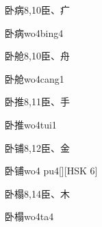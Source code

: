 \begin{Entry}{卧病}{8,10}{⾂、⽧}
  \begin{Phonetics}{卧病}{wo4bing4}
  \end{Phonetics}
\end{Entry}

\begin{Entry}{卧舱}{8,10}{⾂、⾈}
  \begin{Phonetics}{卧舱}{wo4cang1}
  \end{Phonetics}
\end{Entry}

\begin{Entry}{卧推}{8,11}{⾂、⼿}
  \begin{Phonetics}{卧推}{wo4tui1}
  \end{Phonetics}
\end{Entry}

\begin{Entry}{卧铺}{8,12}{⾂、⾦}
  \begin{Phonetics}{卧铺}{wo4 pu4}[][HSK 6]
  \end{Phonetics}
\end{Entry}

\begin{Entry}{卧榻}{8,14}{⾂、⽊}
  \begin{Phonetics}{卧榻}{wo4ta4}
  \end{Phonetics}
\end{Entry}


